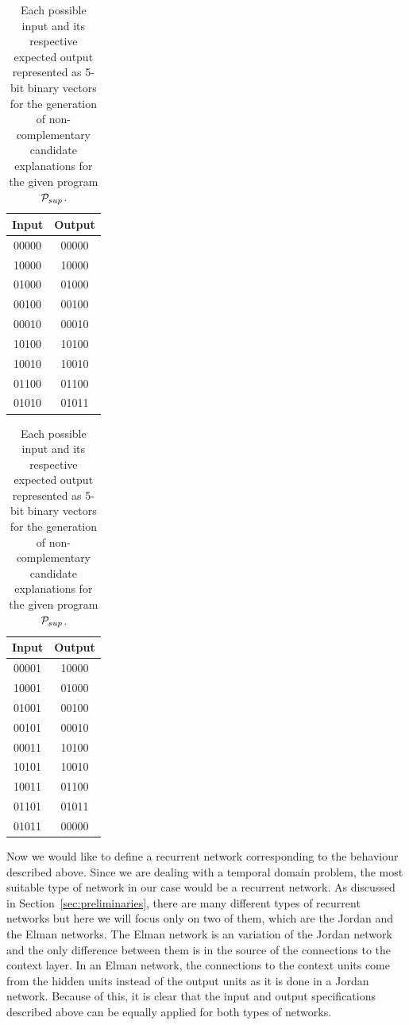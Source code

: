 \begin{table}
		\centering
	\begin{subtable}[h]{0.30\textwidth}
		\centering
		\begin{tabular}{cc}
		Input & Output \\
		\hline
		00000 & 00000 \\
		10000 & 10000 \\
		01000 & 01000 \\
		00100 & 00100 \\
		00010 & 00010 \\
		10100 & 10100 \\
		10010 & 10010 \\
		01100 & 01100 \\
		01010 & 01011 \\
		\end{tabular}
		\bigskip
		\caption{Cases where the fifth bit in the input is \textit{zero}.}
		\label{table:trainingexplanations:zero}
	\end{subtable}
	\hspace{2cm}
	\begin{subtable}[h]{0.30\textwidth}
		\centering
		\begin{tabular}{cc}
		Input & Output \\
		\hline
		00001 & 10000 \\
		10001 & 01000 \\
		01001 & 00100 \\
		00101 & 00010 \\
		00011 & 10100 \\
		10101 & 10010 \\
		10011 & 01100 \\
		01101 & 01011 \\
		01011 & 00000 \\
		\end{tabular}
		\bigskip
		\caption{Cases where the fifth bit in the input is \textit{one}.}
		\label{table:trainingexplanations:one}
	\end{subtable}
	\caption{Each possible input and its respective expected output represented as 5-bit binary vectors for the generation of non-complementary candidate explanations for the given program $\mathcal{P}_{sup}$.}
	\label{table:trainingexplanations}
\end{table}

Now we would like to define a recurrent network corresponding to the behaviour described above. Since we are dealing with a temporal domain problem, the most suitable type of network in our case would be a recurrent network. As discussed in Section~\ref{sec:preliminaries}, there are many different types of recurrent networks but here we will focus only on two of them, which are the Jordan and the Elman networks. The Elman network is an variation of the Jordan network and the only difference between them is in the source of the connections to the context layer. In an Elman network, the connections to the context units come from the hidden units instead of the output units as it is done in a Jordan network. Because of this, it is clear that the input and output specifications described above can be equally applied for both types of networks.

